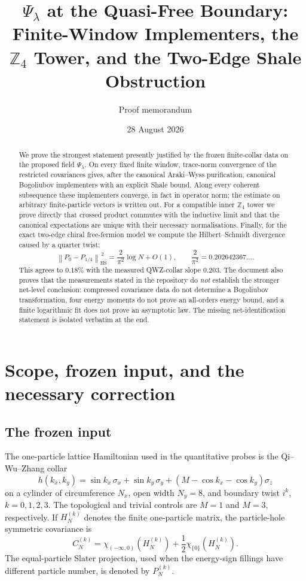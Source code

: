 \documentclass[11pt]{article}
\title{\texorpdfstring{$\Psi_\lambda$}{Psi-lambda} at the Quasi-Free Boundary:\\
Finite-Window Implementers, the \texorpdfstring{$\mathbb Z_4$}{Z4} Tower,
and the Two-Edge Shale Obstruction}
\author{Proof memorandum}
\date{28 August 2026}
\theoremstyle{remark}
\newcommand{\HS}{\mathrm{HS}}
\newcommand{\norm}[1]{\left\lVert #1\right\rVert}
\begin{document}
\maketitle

\begin{abstract}
We prove the strongest statement presently justified by the frozen
finite-collar data on the proposed field $\Psi_\lambda$.  On every fixed
finite window, trace-norm convergence of the restricted covariances gives,
after the canonical Araki--Wyss purification, canonical Bogoliubov
implementers with an explicit Shale bound.  Along every coherent
subsequence these implementers converge, in fact in operator norm; the
estimate on arbitrary finite-particle vectors is written out.  For a
compatible inner $\mathbb Z_4$ tower we prove directly that crossed product
commutes with the inductive limit and that the canonical expectations are
unique with their necessary normalisations.  Finally, for the exact
two-edge chiral free-fermion model we compute the Hilbert--Schmidt
divergence caused by a quarter twist:
\[
 \norm{P_0-P_{1/4}}_{\HS}^{\,2}
 =\frac{2}{\pi^2}\log N+O(1),
 \qquad \frac{2}{\pi^2}=0.202642367\ldots .
\]
This agrees to $0.18\%$ with the measured QWZ-collar slope $0.203$.
The document also proves that the measurements stated in the repository
do \emph{not} establish the stronger net-level conclusion: compressed
covariance data do not determine a Bogoliubov transformation, four energy
moments do not prove an all-orders energy bound, and a finite logarithmic
fit does not prove an asymptotic law.  The missing net-identification
statement is isolated verbatim at the end.
\end{abstract}

\tableofcontents

\section{Scope, frozen input, and the necessary correction}

\subsection{The frozen input}

The one-particle lattice Hamiltonian used in the quantitative probes is
the Qi--Wu--Zhang collar
\[
 h(k_x,k_y)=\sin k_x\,\sigma_x+\sin k_y\,\sigma_y+
 (M-\cos k_x-\cos k_y)\sigma_z
\]
on a cylinder of circumference $N_x$, open width $N_y=8$, and boundary
twist $i^k$, $k=0,1,2,3$.  The topological and trivial controls are
$M=1$ and $M=3$, respectively.  If $H_N^{(k)}$ denotes the finite
one-particle matrix, the particle-hole symmetric covariance is
\[
 C_N^{(k)}
 =\chi_{(-\infty,0)}(H_N^{(k)})
   +\frac12\chi_{\{0\}}(H_N^{(k)}).
\]
The equal-particle Slater projection, used when the energy-sign fillings
have different particle number, is denoted by $P_N^{(k)}$.
\end{document}
